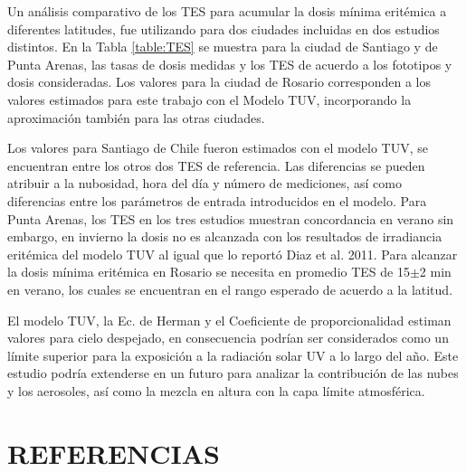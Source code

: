 \documentclass[10pt,twocolumn]{article}
\begin{document}
Un análisis comparativo de los TES para acumular la dosis mínima eritémica a diferentes latitudes, fue utilizando para dos ciudades incluidas en dos estudios distintos.\cite{Diaz2011,cabrera_radiacion_2005}  En la Tabla \ref{table:TES} se muestra para la ciudad de Santiago y de Punta Arenas, las tasas de dosis medidas y los TES de acuerdo a los fototipos y dosis consideradas. Los valores para la ciudad de Rosario corresponden a los valores estimados para este trabajo con el Modelo TUV, incorporando la aproximación también para las otras ciudades.

Los valores para Santiago de Chile fueron estimados con el modelo TUV, se encuentran entre los otros dos TES de referencia. Las diferencias se pueden atribuir a la nubosidad, hora del día y número de mediciones, así como diferencias entre los parámetros de entrada introducidos en el modelo. Para Punta Arenas, los TES en los tres estudios muestran concordancia en verano sin embargo, en invierno la dosis no es alcanzada con los resultados de irradiancia eritémica del modelo TUV al igual que lo reportó Diaz et al. 2011. Para alcanzar la dosis mínima eritémica en Rosario se necesita en promedio TES de 15$\pm$2 min en verano, los cuales se encuentran en el rango esperado de acuerdo a la latitud.

El modelo TUV, la Ec. de Herman y el Coeficiente de proporcionalidad estiman valores para cielo despejado, en consecuencia podrían ser considerados como un límite superior para la exposición a la radiación solar UV a lo largo del año. Este estudio podría extenderse en un futuro para analizar la contribución de las nubes y los aerosoles,\cite{Kim2020} así como la mezcla en altura con la capa límite atmosférica.
\section{REFERENCIAS}
\renewcommand{\refname}{}

\end{document}
